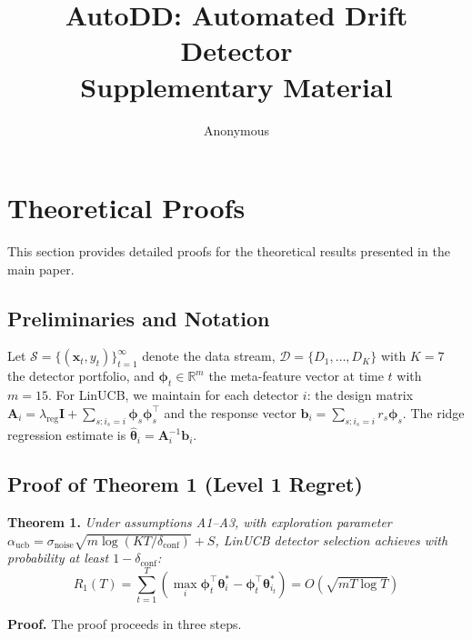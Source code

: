 \documentclass[11pt]{article}
\begin{document}
\title{AutoDD: Automated Drift Detector\\
\Large Supplementary Material}

\author{Anonymous}
\date{}

\maketitle

\appendix

\section{Theoretical Proofs}\label{appendix:proofs}

This section provides detailed proofs for the theoretical results presented in the main paper.

\subsection{Preliminaries and Notation}

Let $\mathcal{S} = \{(\mathbf{x}_t, y_t)\}_{t=1}^{\infty}$ denote the data stream, $\mathcal{D} = \{D_1, \ldots, D_K\}$ with $K=7$ the detector portfolio, and $\boldsymbol{\phi}_t \in \mathbb{R}^m$ the meta-feature vector at time $t$ with $m=15$. For LinUCB, we maintain for each detector $i$: the design matrix $\mathbf{A}_i = \lambda_{\text{reg}}\mathbf{I} + \sum_{s:i_s=i} \boldsymbol{\phi}_s \boldsymbol{\phi}_s^\top$ and the response vector $\mathbf{b}_i = \sum_{s:i_s=i} r_s \boldsymbol{\phi}_s$. The ridge regression estimate is $\hat{\boldsymbol{\theta}}_i = \mathbf{A}_i^{-1} \mathbf{b}_i$.

\subsection{Proof of Theorem 1 (Level 1 Regret)}

\textbf{Theorem 1.} \textit{Under assumptions A1--A3, with exploration parameter $\alpha_{\text{ucb}} = \sigma_{\text{noise}}\sqrt{m \log(KT/\delta_{\text{conf}})} + S$, LinUCB detector selection achieves with probability at least $1 - \delta_{\text{conf}}$:}
\begin{equation}
R_1(T) = \sum_{t=1}^{T} \left( \max_{i} \boldsymbol{\phi}_t^\top \boldsymbol{\theta}_i^* - \boldsymbol{\phi}_t^\top \boldsymbol{\theta}_{i_t}^* \right) = O(\sqrt{mT \log T})
\end{equation}

\textbf{Proof.} The proof proceeds in three steps.
\end{document}
